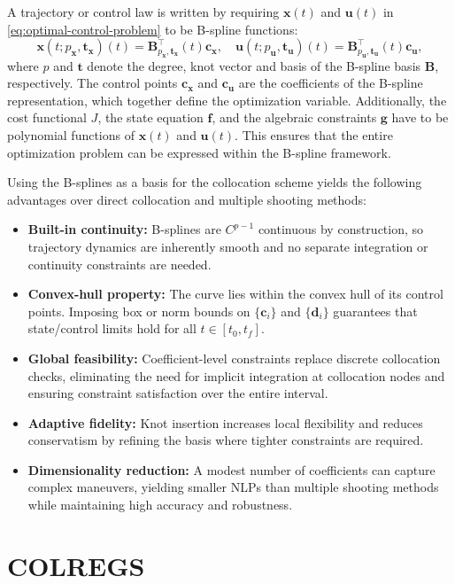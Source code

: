 \newcommand{\bx}{\mathbf{x}}
\newcommand{\bu}{\mathbf{u}}
A trajectory or control law is written by requiring $\mathbf x(t)$ and $\bu(t)$ in \cref{eq:optimal-control-problem} to be B-spline functions:
\[
  \bx(t; p_\bx, \mathbf t_\bx)(t) 
    = \mathbf B^\top_{p_\bx, \mathbf t_\bx}(t)\mathbf c_\bx,
  \quad
  \bu(t; p_\bu, \mathbf t_\bu)(t)
    = \mathbf B^\top_{p_\bu, \mathbf t_\bu}(t)\mathbf c_\bu,
\]
where $p$ and $\mathbf t$ denote the degree, knot vector and basis of the B-spline basis $\mathbf B$, respectively. The control points $\mathbf c_\bx$ and $\mathbf c_\bu$ are the coefficients of the B-spline representation, which together define the optimization variable. Additionally, the cost functional $J$, the state equation $\mathbf f$, and the algebraic constraints $\mathbf g$ have to be polynomial functions of $\bx(t)$ and $\bu(t)$. This ensures that the entire optimization problem can be expressed within the B-spline framework.


Using the B-splines as a basis for the collocation scheme yields the following advantages over direct collocation and multiple shooting methods:
\begin{itemize}
  \item \textbf{Built-in continuity:} B-splines are $C^{p-1}$ continuous by construction, so trajectory dynamics are inherently smooth and no separate integration or continuity constraints are needed.
  \item \textbf{Convex-hull property:} The curve lies within the convex hull of its control points. Imposing box or norm bounds on $\{\mathbf c_i\}$ and $\{\mathbf d_i\}$ guarantees that state/control limits hold for all $t\in [t_0,t_f]$.
  \item \textbf{Global feasibility:} Coefficient-level constraints replace discrete collocation checks, eliminating the need for implicit integration at collocation nodes and ensuring constraint satisfaction over the entire interval.
  \item \textbf{Adaptive fidelity:} Knot insertion increases local flexibility and reduces conservatism by refining the basis where tighter constraints are required.
  \item \textbf{Dimensionality reduction:} A modest number of coefficients can capture complex maneuvers, yielding smaller \acrshort{NLP}s than multiple shooting methods while maintaining high accuracy and robustness.
\end{itemize}


\section{COLREGS}\label{sec:colregs}

